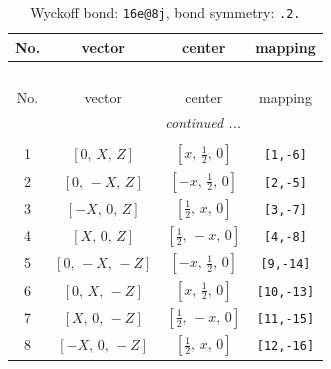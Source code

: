 \documentclass[fleqn,8pt]{jsarticle}
\begin{document}
\begin{longtable}{cccc}
\caption{Wyckoff bond: {\tt 16e@8j}, bond symmetry: {\tt .2.}}
 \\
 \hline \hline
No. & vector & center & mapping \\ \hline \endfirsthead

\multicolumn{3}{l}{\tablename\ \thetable{}} \\
 \hline \hline
No. & vector & center & mapping \\ \hline \endhead

 \hline \hline
\multicolumn{3}{r}{\footnotesize\it continued ...} \\ \endfoot

 \hline \hline
\multicolumn{3}{r}{} \\ \endlastfoot

1 & $\left[ 0,\, X,\, Z \right]$ & $\left[ x,\, \frac{1}{2},\, 0 \right]$ & {\tt [1,-6]} \\ \hline
2 & $\left[ 0,\, - X,\, Z \right]$ & $\left[ - x,\, \frac{1}{2},\, 0 \right]$ & {\tt [2,-5]} \\ \hline
3 & $\left[ - X,\, 0,\, Z \right]$ & $\left[ \frac{1}{2},\, x,\, 0 \right]$ & {\tt [3,-7]} \\ \hline
4 & $\left[ X,\, 0,\, Z \right]$ & $\left[ \frac{1}{2},\, - x,\, 0 \right]$ & {\tt [4,-8]} \\ \hline
5 & $\left[ 0,\, - X,\, - Z \right]$ & $\left[ - x,\, \frac{1}{2},\, 0 \right]$ & {\tt [9,-14]} \\ \hline
6 & $\left[ 0,\, X,\, - Z \right]$ & $\left[ x,\, \frac{1}{2},\, 0 \right]$ & {\tt [10,-13]} \\ \hline
7 & $\left[ X,\, 0,\, - Z \right]$ & $\left[ \frac{1}{2},\, - x,\, 0 \right]$ & {\tt [11,-15]} \\ \hline
8 & $\left[ - X,\, 0,\, - Z \right]$ & $\left[ \frac{1}{2},\, x,\, 0 \right]$ & {\tt [12,-16]} \\
\end{longtable}
\renewcommand{\arraystretch}{1.2}
\end{document}
